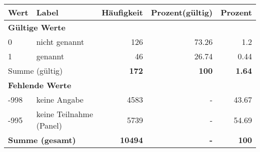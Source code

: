      \begin{longtable}{lXrrr}
     \toprule
     \textbf{Wert} & \textbf{Label} & \textbf{Häufigkeit} & \textbf{Prozent(gültig)} & \textbf{Prozent} \\
     \endhead
     \midrule
     \multicolumn{5}{l}{\textbf{Gültige Werte}}\\

     0 &
     \multicolumn{1}{X}{ nicht genannt   } &


       \num{126} &
       \num[round-mode=places,round-precision=2]{73.26} &
         \num[round-mode=places,round-precision=2]{1.2} \\

     1 &
     \multicolumn{1}{X}{ genannt   } &


       \num{46} &
       \num[round-mode=places,round-precision=2]{26.74} &
         \num[round-mode=places,round-precision=2]{0.44} \\
     \midrule
     \multicolumn{2}{l}{Summe (gültig)} &
       \textbf{\num{172}} &
     \textbf{\num{100}} &
       \textbf{\num[round-mode=places,round-precision=2]{1.64}} \\
     \multicolumn{5}{l}{\textbf{Fehlende Werte}}\\
       -998 &
       keine Angabe &
         \num{4583} &
        - &
         \num[round-mode=places,round-precision=2]{43.67} \\
       -995 &
       keine Teilnahme (Panel) &
         \num{5739} &
        - &
         \num[round-mode=places,round-precision=2]{54.69} \\
     \midrule
     \multicolumn{2}{l}{\textbf{Summe (gesamt)}} &
          \textbf{\num{10494}} &
        \textbf{-} &
        \textbf{\num{100}} \\
     \bottomrule
     \end{longtable}
     
